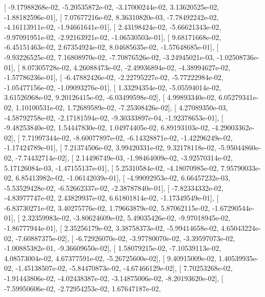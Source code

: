 \documentclass{article}
\begin{document}
       [ -9.17988268e-02,  -5.20535872e-02,  -3.17000244e-02,
          3.13620525e-02,  -1.88182596e-01],
       [  7.07677216e-02,   8.36310820e-03,  -7.78492242e-02,
         -4.16113911e-02,  -1.94661641e-01],
       [  2.43198424e-02,  -5.66621343e-02,  -9.97091951e-02,
         -2.92163921e-02,  -1.06530503e-01],
       [  9.68171668e-02,  -6.45151463e-02,   2.67354924e-02,
          8.04685635e-02,  -1.57648685e-01],
       [ -9.93226525e-02,   7.16808970e-02,  -7.70876526e-02,
         -3.24945021e-03,  -1.02508736e-01],
       [  8.07305728e-02,   4.26088473e-02,  -2.49936894e-02,
         -4.38994627e-02,  -1.57786236e-01],
       [ -6.47882426e-02,  -2.22795227e-02,  -5.77222984e-02,
         -1.05477156e-02,  -1.09093276e-01],
       [  1.33294354e-02,  -5.05594014e-02,   3.61526968e-02,
          9.20126415e-02,  -6.03499598e-02],
       [  4.99893340e-02,   6.05279341e-02,   1.10100531e-02,
          1.72689589e-02,  -7.25308426e-02],
       [  4.27089350e-03,  -4.58792758e-02,  -2.17181594e-02,
         -9.30333897e-04,  -1.92378653e-01],
       [ -9.48253840e-02,   1.54447830e-02,   1.04974405e-02,
          6.89193103e-02,  -4.29003362e-02],
       [  7.71997344e-02,  -8.60077897e-02,  -6.14328871e-02,
         -1.42296249e-02,  -1.17424789e-01],
       [  7.21374506e-02,   3.99420331e-02,   9.32178118e-02,
         -5.95044860e-02,  -7.74432714e-02],
       [  2.14496749e-03,  -1.98464009e-02,  -3.92570314e-02,
          5.17126084e-03,  -1.47155137e-01],
       [  5.25310584e-02,  -4.18070985e-02,   7.95790033e-02,
          6.85413982e-02,  -1.06142039e-01],
       [ -4.99092953e-02,   6.66457232e-03,  -5.53529428e-02,
         -6.52662337e-02,  -2.38787840e-01],
       [ -7.82334332e-02,  -4.83977747e-02,   2.43829937e-02,
          6.61801814e-02,  -1.17349549e-01],
       [ -6.83730271e-02,   3.40275776e-02,   1.79663879e-02,
          5.87062115e-02,  -1.67290544e-01],
       [  2.32359983e-02,  -3.80624609e-02,   5.49035426e-02,
         -9.97018945e-02,  -1.86777944e-01],
       [  2.35256179e-02,   3.38758373e-02,  -5.99414658e-02,
          4.65043224e-02,  -7.60887375e-02],
       [ -6.72926070e-02,  -3.97780070e-02,  -3.39597073e-02,
         -1.00885382e-01,  -9.36609650e-02],
       [  1.58079215e-02,  -7.10539113e-02,   4.08573004e-02,
          4.67377591e-02,  -5.26725600e-02],
       [  9.40915009e-02,   1.40539935e-02,  -1.45138507e-02,
         -5.84470873e-02,  -4.67466129e-02],
       [  7.70253268e-02,  -1.91443806e-02,  -4.02438387e-02,
         -3.14875006e-02,  -8.20193620e-02],
       [ -7.59950606e-02,  -2.72954253e-02,   1.67647187e-02,
\end{document}
